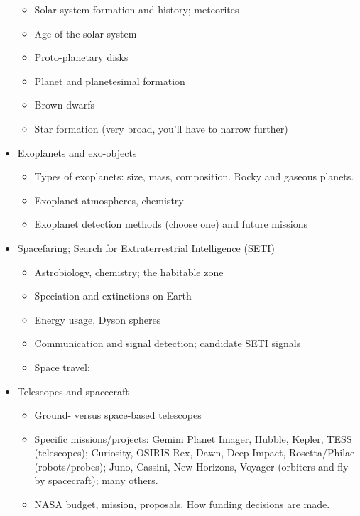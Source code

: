 \documentclass[11pt]{article}%
\begin{document}
\begin{itemize}[noitemsep]
        \begin{itemize}[noitemsep]
            \item Solar system formation and history; meteorites
            \item Age of the solar system
            \item Proto-planetary disks
            \item Planet and planetesimal formation
            \item Brown dwarfs
            \item Star formation (very broad, you'll have to narrow further)
        \end{itemize}
    \item Exoplanets and exo-objects
        \begin{itemize}[noitemsep]
            \item Types of exoplanets: size, mass, composition.  Rocky and
                gaseous planets.
            \item Exoplanet atmospheres, chemistry
            \item Exoplanet detection methods (choose one) and future missions
        \end{itemize}
    \item Spacefaring; Search for Extraterrestrial Intelligence (SETI)
        \begin{itemize}[noitemsep]
            \item Astrobiology, chemistry; the habitable zone
            \item Speciation and extinctions on Earth
            \item Energy usage, Dyson spheres
            \item Communication and signal detection; candidate SETI signals
            \item Space travel; 
        \end{itemize}
    \item Telescopes and spacecraft
        \begin{itemize}[noitemsep]
            \item Ground- versus space-based telescopes
            \item Specific missions/projects: Gemini Planet Imager, Hubble,
                Kepler, TESS (telescopes); Curiosity, OSIRIS-Rex, Dawn, Deep
                Impact, Rosetta/Philae (robots/probes); Juno, Cassini, New
                Horizons, Voyager (orbiters and fly-by spacecraft); many
                others.
            \item NASA budget, mission, proposals.  How funding decisions
                are made.
        \end{itemize}
\end{itemize}
\end{document}
